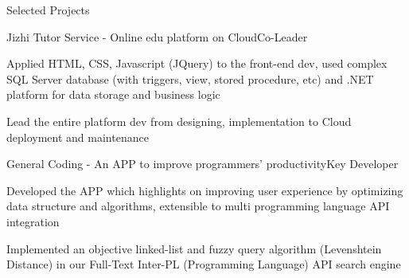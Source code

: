 \documentclass{resume} %
\newcommand{\tab}[1]{\hspace{.2667\textwidth}\rlap{#1}}
\newcommand{\itab}[1]{\hspace{0em}\rlap{#1}}
\begin{document}
\begin{rSection}{Selected Projects}

\begin{rSubsection}{Jizhi Tutor Service - Online edu platform on Cloud}{Co-Leader}{}{}
\item Applied HTML, CSS, Javascript (JQuery) to the front-end dev, used complex SQL Server database (with triggers, view, stored procedure, etc) and .NET platform for data storage and business logic
\item Lead the entire platform dev from designing, implementation to Cloud deployment and maintenance
\end{rSubsection}


\begin{rSubsection}{General Coding - An APP to improve programmers' productivity}{Key Developer}{}{}
\item Developed the APP which highlights on improving user experience by optimizing data structure and algorithms, extensible to multi programming language API integration
\item Implemented an objective linked-list and fuzzy query algorithm (Levenshtein Distance) in our Full-Text
Inter-PL (Programming Language) API search engine
\end{rSubsection}


\end{rSection}




\end{document}
